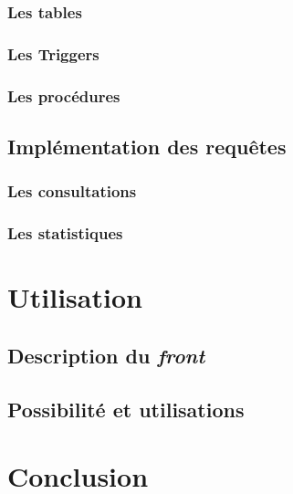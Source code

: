\documentclass[10pt]{article}
\begin{document}
  \subsubsection{Les tables}
  \subsubsection{Les Triggers}
  \subsubsection{Les procédures}
  
  \subsection{Implémentation des requêtes}\label{subsec:requete}
  \subsubsection{Les consultations}
  \subsubsection{Les statistiques}
  
  \section{Utilisation}\label{sec:utili}
  \subsection{Description du \textit{front}}\label{subsec:desc}
  \subsection{Possibilité et utilisations}\label{subsec:possib}

  \section{Conclusion}\label{sec:ccl}
\end{document}
